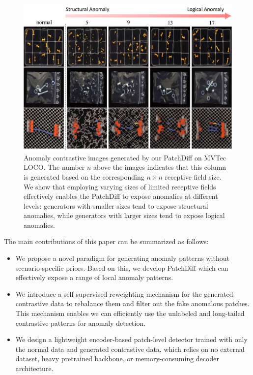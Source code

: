 \documentclass[letterpaper]{article} %
\begin{document}
\begin{figure}[!t]
    \centering
    \includegraphics[width=\linewidth]{images/loco_generation_results.pdf}
    \vspace{-0.4cm}
    \caption{Anomaly contrastive images generated by our PatchDiff on MVTec LOCO. The number $n$ above the images indicates that this column is generated based on the corresponding $n \times n$ receptive field size. We show that employing varying sizes of limited receptive fields effectively enables the PatchDiff to expose anomalies at different levels: generators with smaller sizes tend to expose structural anomalies, while generators with larger sizes tend to expose logical anomalies.}%
    \label{fig: loco_generation_results}
    \vspace{-0.4cm}
\end{figure}

The main contributions of this paper can be summarized as follows:
\begin{itemize}
    \item We propose a novel paradigm for generating anomaly patterns without scenario-specific priors. Based on this, we develop PatchDiff which can effectively expose a range of local anomaly patterns.
    \item We introduce a self-supervised reweighting mechanism for the generated contrastive data to rebalance them and filter out the fake anomalous patches. This mechanism enables we can efficiently use the unlabeled and long-tailed contrastive patterns for anomaly detection.
    \item We design a lightweight encoder-based patch-level detector trained with only the normal data and generated contrastive data, which relies on no external dataset, heavy pretrained backbone, or memory-consuming decoder architecture. 
\end{itemize}
\end{document}
